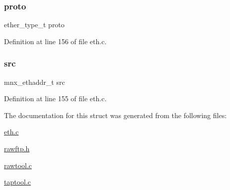 \subsubsection{\texorpdfstring{proto}{proto}}
{\footnotesize\ttfamily ether\+\_\+type\+\_\+t proto}



Definition at line 156 of file eth.\+c.

\hypertarget{struct__eth__hdr_a96824bdc9a1daeb91ebe94d82f3356cd}{}\label{struct__eth__hdr_a96824bdc9a1daeb91ebe94d82f3356cd} 
\subsubsection{\texorpdfstring{src}{src}}
{\footnotesize\ttfamily mnx\+\_\+ethaddr\+\_\+t src}



Definition at line 155 of file eth.\+c.



The documentation for this struct was generated from the following files\+:\begin{DoxyCompactItemize}
\item 
\hyperlink{eth_8c}{eth.\+c}\item 
\hyperlink{rawftp_8h}{rawftp.\+h}\item 
\hyperlink{rawtool_8c}{rawtool.\+c}\item 
\hyperlink{taptool_8c}{taptool.\+c}\end{DoxyCompactItemize}
